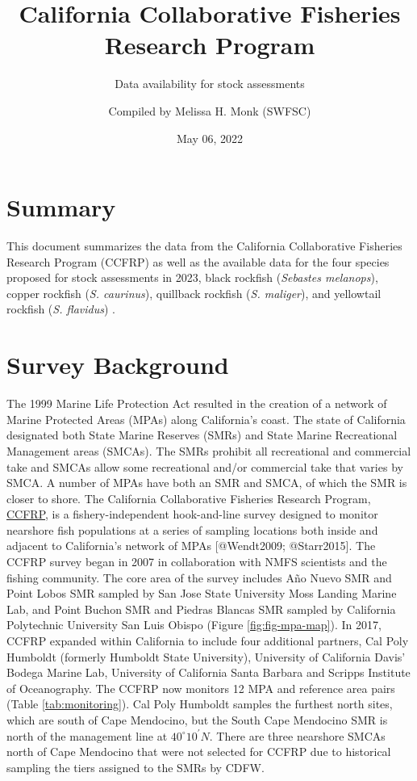 \documentclass[
]{article}
\title{California Collaborative Fisheries Research Program}
\subtitle{Data availability for stock assessments}
\author{Compiled by Melissa H. Monk (SWFSC)}
\date{May 06, 2022}
\begin{document}
\maketitle

\newcommand\CapeM{$40^\circ 10^\prime N$}

\hypertarget{summary}{%
\section{Summary}\label{summary}}

This document summarizes the data from the California Collaborative
Fisheries Research Program (CCFRP) as well as the available data for the four
species proposed for stock assessments in 2023, black rockfish (\emph{Sebastes melanops}),
copper rockfish (\emph{S. caurinus}), quillback rockfish (\emph{S. maliger}), and
yellowtail rockfish (\emph{S. flavidus}) .

\hypertarget{survey-background}{%
\section{Survey Background}\label{survey-background}}

The 1999 Marine Life Protection Act resulted in the creation of a network of
Marine Protected Areas (MPAs) along California's coast. The state of California
designated both State Marine Reserves (SMRs) and State Marine Recreational
Management areas (SMCAs). The SMRs prohibit all recreational and commercial take
and SMCAs allow some recreational and/or commercial take that varies by SMCA.
A number of MPAs have both an SMR and SMCA, of which the SMR is closer to shore.
The California Collaborative Fisheries Research Program,
\href{https://www.mlml.calstate.edu/ccfrp/}{CCFRP},
is a fishery-independent hook-and-line survey designed to monitor nearshore fish
populations at a series of sampling locations both inside and adjacent to
California's network of MPAs {[}@Wendt2009; @Starr2015{]}. The CCFRP survey began in
2007 in collaboration with NMFS scientists and the fishing community. The core
area of the survey includes Año Nuevo SMR and Point Lobos SMR sampled by
San Jose State University Moss Landing Marine Lab, and Point Buchon SMR
and Piedras Blancas SMR sampled by California Polytechnic University
San Luis Obispo (Figure \ref{fig:fig-mpa-map}). In 2017, CCFRP expanded within
California to
include four additional partners, Cal Poly Humboldt (formerly Humboldt State
University), University of California Davis' Bodega Marine Lab, University
of California Santa Barbara and Scripps Institute of Oceanography.
The CCFRP now monitors 12 MPA and reference area pairs (Table \ref{tab:monitoring}).
Cal Poly Humboldt samples the furthest north sites, which are south of Cape
Mendocino, but the South Cape Mendocino SMR is north of the management line at
$40^\circ 10^\prime N$. There are three nearshore SMCAs north of Cape Mendocino that
were not selected for CCFRP due to historical sampling the tiers assigned to the
SMRs by CDFW.
\end{document}
